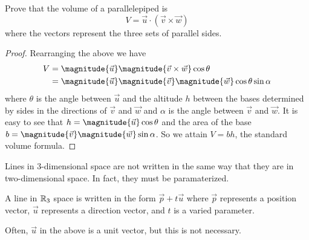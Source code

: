 \documentclass[12pt]{scrartcl}
\begin{document}
\begin{example}
    Prove that the volume of a parallelepiped is
    \[V = \vec{u} \cdot (\vec{v} \times \vec{w})\]
    where the vectors represent the three sets of parallel sides.

    \begin{proof}
        Rearranging the above we have
        \begin{align*}
            V &= \magnitude{\vec{u}} \magnitude{\vec{v} \times \vec{w}} \cos\theta \\
            &= \magnitude{\vec{u}} \magnitude{\vec{v}} \magnitude{\vec{w}} \cos\theta \sin\alpha
        \end{align*}
        where $\theta$ is the angle between $\vec{u}$ and the altitude $h$ between the bases determined by sides in the directions of $\vec{v}$ and $\vec{w}$ and $\alpha$ is the angle between $\vec{v}$ and $\vec{w}$. It is easy to see that $h = \magnitude{\vec{u}}\cos\theta$ and the area of the base $b = \magnitude{\vec{v}} \magnitude{\vec{w}} \sin\alpha$. So we attain $V = bh$, the standard volume formula.
    \end{proof}
\end{example}

Lines in 3-dimensional space are not written in the same way that they are in two-dimensional space. In fact, they must be paramaterized.

\begin{definition}
    A line in $\mathbb R_{3}$ space is written in the form $\vec{p} + t\vec{u}$ where $\vec{p}$ represents a position vector, $\vec{u}$ represents a direction vector, and $t$ is a varied parameter.
\end{definition}

\begin{remark}
    Often, $\vec{u}$ in the above is a unit vector, but this is not necessary.
\end{remark}
\end{document}
